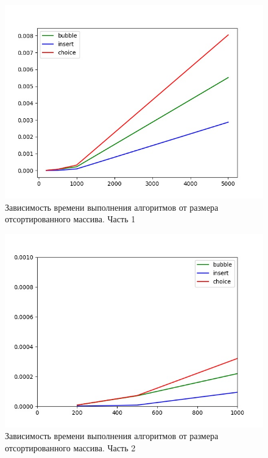 \documentclass[14pt,russian]{scrartcl}
\begin{document}
    \begin{figure}
    \centering
    \includegraphics[scale=0.7]{sorted_full.jpeg}
    \caption{Зависимость времени выполнения алгоритмов от  размера отсортированного массива. Часть 1}
    \label{img:sorted_arr_full}
\end{figure}
\begin{figure}
    \centering
    \includegraphics[scale=0.7]{sorted_part.jpeg}
    \caption{Зависимость времени выполнения алгоритмов от  размера отсортированного массива. Часть 2}
    \label{img:sorted_arr_part}
\end{figure}
\end{document}
